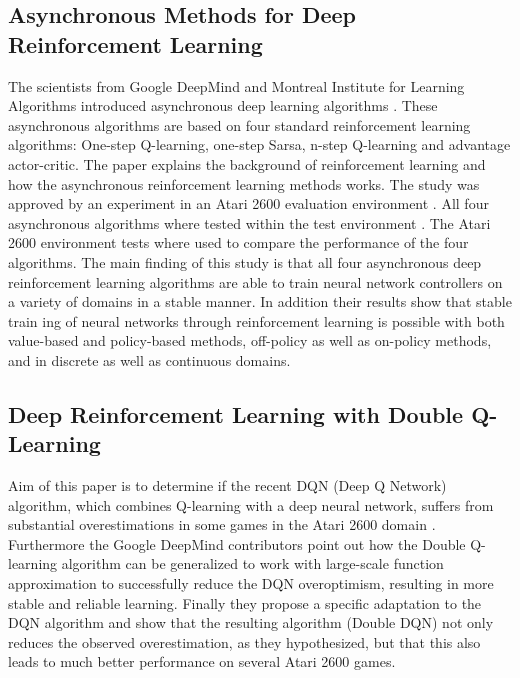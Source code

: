 \documentclass[conference]{IEEEtran}
\begin{document}
\subsection{Asynchronous Methods for Deep Reinforcement Learning}
The scientists from Google DeepMind and Montreal Institute for Learning Algorithms introduced asynchronous deep learning algorithms \cite{DBLP:journals/corr/MnihBMGLHSK16}. These asynchronous algorithms are based on four standard reinforcement learning algorithms: One-step Q-learning, one-step Sarsa, n-step Q-learning and advantage actor-critic. The paper explains the background of reinforcement learning and how the asynchronous reinforcement learning methods works. The study was approved by an experiment in an Atari 2600 evaluation environment . All four asynchronous algorithms where tested within the test environment  . The Atari 2600 environment tests where used to compare the performance of the four algorithms. The main finding of this study is that all four asynchronous deep reinforcement learning algorithms are able to train neural network controllers on a variety of domains in a stable manner. In addition their results show that stable train ing of neural networks through reinforcement learning is possible with both value-based and policy-based methods, off-policy as well as on-policy methods, and in discrete as well as continuous domains. 

\subsection{Deep Reinforcement Learning with Double Q-Learning}
Aim of this paper is to determine if the recent DQN (Deep Q Network) algorithm, which combines Q-learning with a deep neural network, suffers from substantial overestimations in some games in the Atari 2600 domain \cite{DBLP:journals/corr/HasseltGS15}. Furthermore the Google DeepMind contributors point out how the Double Q-learning algorithm can be generalized to work with large-scale function approximation to successfully reduce the DQN overoptimism, resulting in more stable and reliable learning. Finally they propose a specific adaptation to the DQN algorithm and show that the resulting algorithm (Double DQN) not only reduces the observed overestimation, as they hypothesized, but that this also leads to much better performance on several Atari 2600 games.
\end{document}

